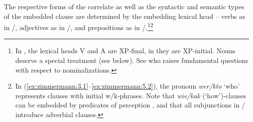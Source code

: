 \documentclass[output=paper]{langscibook}
\begin{document}
The respective forms of the correlate as well as the syntactic and semantic types of the embedded clause are determined by the embedding lexical head -- verbs as in /, adjectives as in /, and prepositions as in /.\footnote{In , the lexical heads V and A are XP-final, in  they are XP-initial. Nouns deserve a special treatment (see below). See \citet{Knjazev2016} who raises fundamental questions with respect to nominalizations.}\footnote{In (\ref{ex:zimmermann:3.1}--\ref{ex:zimmermann:5.2}), the pronoun \textit{wer/kto} `who' represents clauses with initial w/k-phrases. Note that \textit{wie/kak} (`how')-clauses can be embedded by predicates of perception \citep[see][]{Zimmermann1991}, and that all subjunctions in / introduce adverbial clauses.}
\end{document}
